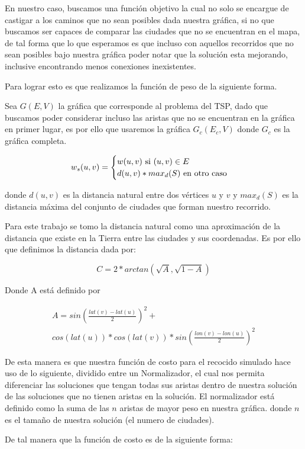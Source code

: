 \begin{multicols}{2}
En nuestro caso, buscamos una función objetivo la cual no solo se encargue de castigar a los caminos que no sean posibles dada nuestra gráfica, si no que buscamos ser capaces de comparar las ciudades que no se encuentran en el mapa, de tal forma que lo que esperamos es que incluso con aquellos recorridos que no sean posibles bajo nuestra gráfica poder notar que la solución esta mejorando, inclusive encontrando menos conexiones inexistentes.

Para lograr esto es que realizamos la función de peso de la siguiente forma.

Sea $G(E,V)$ la gráfica que corresponde al problema del TSP, dado que buscamos poder considerar incluso las aristas que no se encuentran en la gráfica en primer lugar, es por ello que usaremos la gráfica $G_c(E_c, V)$ donde $G_c$ es la gráfica completa.

\[
  w_s(u,v) =
  \begin{cases}
    w(u,v) $ si $ (u,v) \in E \\
    d(u,v) * max_d(S) $ en otro caso$
  \end{cases}
\]

donde $d(u,v)$ es la distancia natural entre dos vértices $u$ y $v$ y $max_d(S)$ es la distancia máxima del conjunto de ciudades que forman nuestro recorrido.

Para este trabajo se tomo la distancia natural como una aproximación de la distancia que existe en la Tierra entre las ciudades y sus coordenadas. Es por ello que definimos la distancia dada por:

\[
  C = 2 * arctan(\sqrt{A}, \sqrt{1-A})
\]

Donde A está definido por

\[
  \begin{aligned}
  A = sin(\frac{lat(v) - lat(u)}{2})^2 +  \\
  cos(lat(u)) * cos(lat(v)) * sin(\frac{lon(v) - lon(u)}{2})^2
  \end{aligned}
\]

De esta manera es que nuestra función de costo para el recocido simulado hace uso de lo siguiente, dividido entre un Normalizador, el cual nos permita diferenciar las soluciones que tengan todas sus aristas dentro de nuestra solución de las soluciones que no tienen aristas en la solución. El normalizador está definido como la suma de las $n$ aristas de mayor peso en nuestra gráfica. donde $n$ es el tamaño de nuestra solución (el numero de ciudades).

De tal manera que la función de costo es de la siguiente forma:


\end{multicols}
